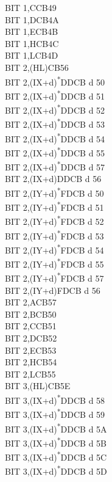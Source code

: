 \documentclass[twoside,openright,a4paper]{book}
\begin{document}
\begin{multicols}{3}
{\begin{tabbing}
	BIT 1,C\>CB49\\
	BIT 1,D\>CB4A\\
	BIT 1,E\>CB4B\\
	BIT 1,H\>CB4C\\
	BIT 1,L\>CB4D\\
	BIT 2,(HL)\>CB56\\
	BIT 2,(IX+d)\textsuperscript{*}\>DDCB d 50\\
	BIT 2,(IX+d)\textsuperscript{*}\>DDCB d 51\\
	BIT 2,(IX+d)\textsuperscript{*}\>DDCB d 52\\
	BIT 2,(IX+d)\textsuperscript{*}\>DDCB d 53\\
	BIT 2,(IX+d)\textsuperscript{*}\>DDCB d 54\\
	BIT 2,(IX+d)\textsuperscript{*}\>DDCB d 55\\
	BIT 2,(IX+d)\textsuperscript{*}\>DDCB d 57\\
	BIT 2,(IX+d)\>DDCB d 56\\
	BIT 2,(IY+d)\textsuperscript{*}\>FDCB d 50\\
	BIT 2,(IY+d)\textsuperscript{*}\>FDCB d 51\\
	BIT 2,(IY+d)\textsuperscript{*}\>FDCB d 52\\
	BIT 2,(IY+d)\textsuperscript{*}\>FDCB d 53\\
	BIT 2,(IY+d)\textsuperscript{*}\>FDCB d 54\\
	BIT 2,(IY+d)\textsuperscript{*}\>FDCB d 55\\
	BIT 2,(IY+d)\textsuperscript{*}\>FDCB d 57\\
	BIT 2,(IY+d)\>FDCB d 56\\
	BIT 2,A\>CB57\\
	BIT 2,B\>CB50\\
	BIT 2,C\>CB51\\
	BIT 2,D\>CB52\\
	BIT 2,E\>CB53\\
	BIT 2,H\>CB54\\
	BIT 2,L\>CB55\\
	BIT 3,(HL)\>CB5E\\
	BIT 3,(IX+d)\textsuperscript{*}\>DDCB d 58\\
	BIT 3,(IX+d)\textsuperscript{*}\>DDCB d 59\\
	BIT 3,(IX+d)\textsuperscript{*}\>DDCB d 5A\\
	BIT 3,(IX+d)\textsuperscript{*}\>DDCB d 5B\\
	BIT 3,(IX+d)\textsuperscript{*}\>DDCB d 5C\\
	BIT 3,(IX+d)\textsuperscript{*}\>DDCB d 5D\\

\end{tabbing}}
\end{multicols}
\end{document}
